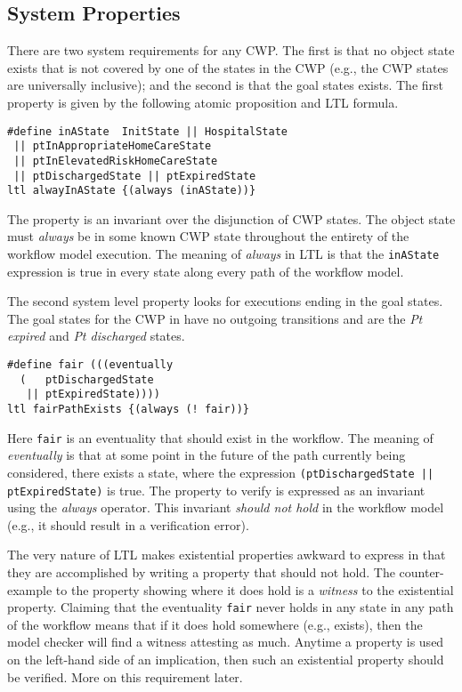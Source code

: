 \subsection{System Properties}
There are two system requirements for any CWP. The first is that no object state exists that is not covered by one of the states in the CWP (e.g., the CWP states are universally inclusive); and the second is that the goal states exists. The first property is given by the following atomic proposition and LTL formula.
%
{\small
\begin{lstlisting}[style=myPromela]
#define inAState  InitState || HospitalState 
 || ptInAppropriateHomeCareState 
 || ptInElevatedRiskHomeCareState
 || ptDischargedState || ptExpiredState
ltl alwayInAState {(always (inAState))}
\end{lstlisting}
}
%
\noindent The property is an invariant over the disjunction of CWP states. The object state must \emph{always} be in some known CWP state throughout the entirety of the workflow model execution. The meaning of \emph{always} in LTL is that the \texttt{inAState} expression is true in every state along every path of the workflow model.

The second system level property looks for executions ending in the goal states. The goal states for the CWP in  have no outgoing transitions and are the \emph{Pt expired} and \emph{Pt discharged} states.
%
{\small
\begin{lstlisting}[style=myPromela]
#define fair (((eventually 
  (   ptDischargedState 
   || ptExpiredState))))
ltl fairPathExists {(always (! fair))}
\end{lstlisting}
}
%
\noindent Here \texttt{fair} is an eventuality that should exist in the workflow. The meaning of \emph{eventually} is that at some point in the future of the path currently being considered, there exists a state, where the expression \texttt{(ptDischargedState || ptExpiredState)} is true. The property to verify is expressed as an invariant using the \emph{always} operator. This invariant \emph{should not hold} in the workflow model (e.g., it should result in a verification error). 

The very nature of LTL makes existential properties awkward to express in that they are accomplished by writing a property that should not hold. The counter-example to the property showing where it does hold is a \emph{witness} to the existential property. Claiming that the eventuality \texttt{fair} never holds in any state in any path of the workflow means that if it does hold somewhere (e.g., exists), then the model checker will find a witness attesting as much. Anytime a property is used on the left-hand side of an implication, then such an existential property should be verified. More on this requirement later.

